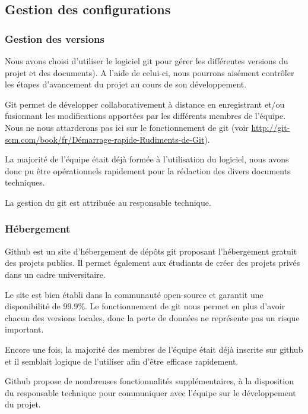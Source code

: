\documentclass{../../res/univ-projet}
\begin{document}
	\subsection{Gestion des configurations}
		\subsubsection{Gestion des versions}

			Nous avons choisi d'utiliser le logiciel git pour gérer les différentes versions du projet et des documents). A l'aide de celui-ci, nous pourrons aisément contrôler les étapes d'avancement du projet au cours de son développement. 

			Git permet de développer collaborativement à distance en enregistrant et/ou fusionnant les modifications apportées par les différents membres de l'équipe. Nous ne nous attarderons pas ici sur le fonctionnement de git (voir \href{http://git-scm.com/book/fr/Démarrage-rapide-Rudiments-de-Git}{http://git-scm.com/book/fr/Démarrage-rapide-Rudiments-de-Git}).

			La majorité de l'équipe était déjà formée à l'utilisation du logiciel, nous avons donc pu être opérationnels rapidement pour la rédaction des divers documents techniques.

			La gestion du git est attribuée au responsable technique.

		\subsubsection{Hébergement}

			Github est un site d'hébergement de dépôts git proposant l'hébergement gratuit des projets publics. Il permet également aux étudiants de créer des projets privés dans un cadre universitaire.

			Le site est bien établi dans la communauté open-source et garantit une disponibilité de 99.9\%. Le fonctionnement de git nous permet en plus d'avoir chacun des versions locales, donc la perte de données ne représente pas un risque important.


			Encore une fois, la majorité des membres de l'équipe était déjà inscrite sur github et il semblait logique de l'utiliser afin d'être efficace rapidement. 

			Github propose de nombreuses fonctionnalités supplémentaires, à la disposition du responsable technique pour communiquer avec l'équipe sur le développement du projet.
\end{document}
